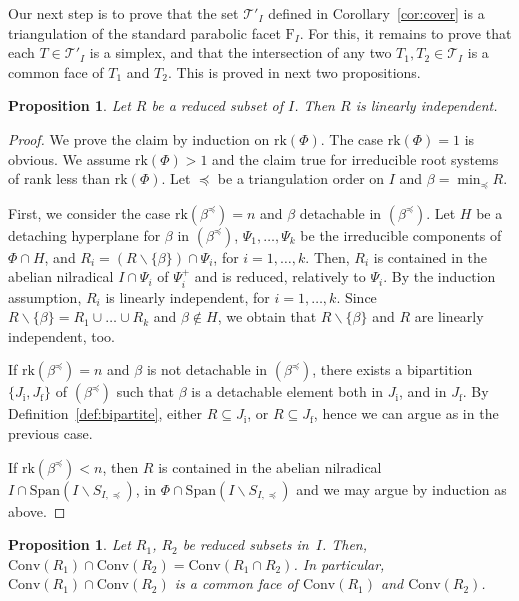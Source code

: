 \documentclass[10pt]{amsart}
\newtheorem{pro}[thm]{Proposition}
\theoremstyle{definition}
\theoremstyle{remark}
\newcommand\mc{\mathcal}
\newcommand\smeno{\smallsetminus}
\newcommand\conv{\mathrm{Conv}}
\newcommand\gen{\mathrm{Span}}
\newcommand\rk{\mathrm{rk}}
\newcommand\be{\beta}
\newcommand\preq{\preccurlyeq}
\begin{document}
Our next step is to prove that the set $\mc T'_I$ defined in Corollary~\ref{cor:cover} is a triangulation of the standard parabolic facet $\mathrm F_I$. 
For this, it remains  to prove that each   $T\in \mathcal T'_I$ is a simplex,  and that the intersection of any two $T_1, T_2\in \mathcal T_I$ is a common face of $T_1$ and $T_2$. 
This is proved in next two propositions.

\begin{pro}\label{pro:reduced-are-independent}
Let $R$ be a reduced subset of $I$. Then $R$ is linearly independent. 
\end{pro}

\begin{proof}
We prove the claim by induction on $\rk(\Phi)$.
The case $\rk(\Phi)=1$ is obvious. We assume $\rk(\Phi)> 1$ and the claim true for irreducible root systems of rank less than $\rk(\Phi)$.
Let $\preq$ be a  triangulation order on $I$ and $\be=\min_\preq R$. 
\par
First, we consider the case $\rk(\be^\preq)=n$ and $\be$ detachable in  $(\be^\preq)$. 
Let $H$ be a detaching hyperplane for $\be$ in  $(\be^\preq)$, $\Psi_1, \dots, \Psi_k$ be the irreducible components of  $\Phi\cap H$, and $R_i=(R\smeno\{\be\})\cap \Psi_i$, for $i=1, \dots, k$.
Then, $R_i$ is contained in the abelian nilradical $I\cap \Psi_i$ of $\Psi_i^+$ and is reduced, relatively to $\Psi_i$.
By the induction assumption, $R_i$ is linearly independent, for $i=1, \dots, k$. 
Since $R\smeno\{\be\}=R_1\cup\dots\cup R_k$ and $\be\not\in H$, we obtain that $R\smeno \{\be\}$ and $R$ are linearly independent, too.
\par
If $\rk(\be^\preq)=n$ and $\be$ is not detachable in  $(\be^\preq)$, there exists a bipartition  $\{J_{\mathrm i}, J_{\mathrm f}\}$ of  $(\be^\preq)$ such that $\be$ is a detachable element both in $J_{\mathrm i}$, and in $J_{\mathrm f}$.
By Definition~\ref{def:bipartite}, either  $R\subseteq J_{\mathrm i}$, or $R\subseteq J_{\mathrm f}$, hence we can argue as in the previous case.
\par
If $\rk(\be^\preq)<n$, then $R$ is contained in the abelian nilradical $I\cap \gen(I\smeno S_{I, \preq})$, in $\Phi\cap \gen(I\smeno S_{I, \preq})$
and we may argue  by induction  as above. 
\end{proof}

\begin{pro}\label{pro:intersection}
Let $R_1$, $R_2$ be reduced subsets in~$I$. 
Then, $\conv(R_1)\cap\conv(R_2)=\conv(R_1\cap R_2)$. 
In particular,  $\conv(R_1)\cap\conv(R_2)$ is a common face of  $\conv(R_1)$ and $\conv(R_2)$. 
\end{pro}
\end{document}
